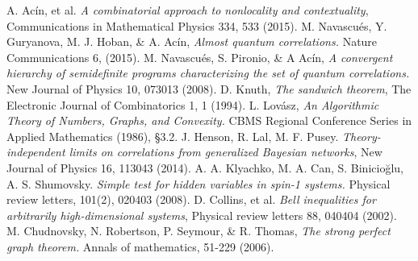 \documentclass[letterpaper]{article}
\begin{document}
\begin{thebibliography}{}
     A. Acín, et al. {\em A combinatorial approach to nonlocality and contextuality}, Communications in Mathematical Physics 334, 533 (2015).
      M. Navascués, Y. Guryanova, M. J. Hoban, \& A. Acín, {\em Almost quantum correlations.}
         Nature Communications 6, (2015).
      M. Navascués, S. Pironio, \& A Acín, 
         {\em A convergent hierarchy of semidefinite programs characterizing the
         set of quantum correlations.}
         New Journal of Physics 10, 073013 (2008).
    D. Knuth, {\em The sandwich theorem}, The Electronic Journal of Combinatorics 1, 1 (1994).
      L. Lovász, 
         {\em An Algorithmic Theory of Numbers, Graphs, and Convexity.}
         CBMS Regional Conference Series in Applied Mathematics (1986), §3.2.
  J. Henson, R. Lal, M. F. Pusey. {\em Theory-independent limits on correlations from generalized Bayesian networks}, New Journal of Physics 16, 113043 (2014).
    A. A. Klyachko, M. A. Can, S. Binicioğlu, A. S. Shumovsky. {\em Simple test for hidden variables in spin-1 systems.}
         Physical review letters, 101(2), 020403 (2008).
    D. Collins, et al. {\em Bell inequalities for arbitrarily high-dimensional systems}, Physical review letters 88, 040404 (2002).
      M. Chudnovsky, N. Robertson, P. Seymour, \& R. Thomas, 
         {\em The strong perfect graph theorem.} 
         Annals of mathematics, 51-229 (2006).
         









         
         
         
         
         
         
         
\end{thebibliography}

\end{document}
